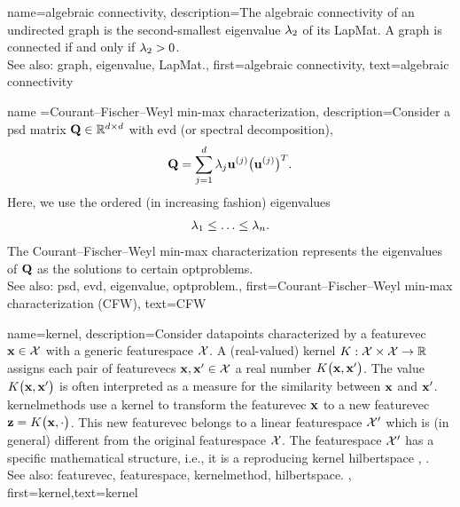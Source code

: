 {name={algebraic connectivity},
	description={The algebraic connectivity of an undirected \gls{graph} 
		is the second-smallest \gls{eigenvalue} $\lambda_{2}$ of its \gls{LapMat}. A \gls{graph} is connected if and only if 
		$\lambda_{2} >0$. 
				\\
		See also: \gls{graph}, \gls{eigenvalue}, \gls{LapMat}.},
	first={algebraic connectivity},
	text={algebraic connectivity}
}


{name ={Courant–Fischer–Weyl min-max characterization}, 
	description={Consider a \gls{psd} 
	matrix $\mathbf{Q} \in \mathbb{R}^{d \times d}$ with 
	\gls{evd} (or spectral decomposition), 
	$$ \mathbf{Q} = \sum_{j=1}^{d} \lambda_{j} {\bf u}^{(j)} \big(  {\bf u}^{(j)}  \big)^{T}.$$ 
	Here, we use the ordered (in increasing fashion) \glspl{eigenvalue} 
	\begin{equation}
		\nonumber
		 \lambda_{1}  \leq  \ldots \leq \lambda_{n}. 
	\end{equation}
	The Courant–Fischer–Weyl min-max characterization \cite[Th. 8.1.2]{GolubVanLoanBook} 
	represents the \glspl{eigenvalue} of $\mathbf{Q}$ as the solutions to certain \glspl{optproblem}.
			\\
		See also: \gls{psd}, \gls{evd}, \gls{eigenvalue}, \gls{optproblem}.}, 
	first={Courant–Fischer–Weyl min-max characterization (CFW)}, 
	text={CFW}
}

{name={kernel}, 
	description={Consider \glspl{datapoint} characterized by a \gls{featurevec} ${\bf x} \in \mathcal{X}$ 
		with a generic \gls{featurespace} $\mathcal{X}$. A (real-valued) kernel $K: \mathcal{X} \times \mathcal{X} \rightarrow \mathbb{R}$ 
		assigns each pair of \glspl{featurevec} ${\bf x}, {\bf x}' \in \mathcal{X}$ a real number $K\big({\bf x},{\bf x}'\big)$. 
		The value $K\big({\bf x},{\bf x}'\big)$ is often interpreted as a measure for the similarity between ${\bf x}$ 
		and ${\bf x}'$. \Glspl{kernelmethod} use a kernel to transform the \gls{featurevec} ${\bf x}$ to a new \gls{featurevec} ${\bf z} = K\big({\bf x},\cdot\big)$. 
         	This new \gls{featurevec} belongs to a linear \gls{featurespace} $\mathcal{X}'$ which is (in general)  
          	different from the original \gls{featurespace} $\mathcal{X}$. The \gls{featurespace} $\mathcal{X}'$ has 
          	a specific mathematical structure, i.e., it is a reproducing kernel \gls{hilbertspace} \cite{LearningKernelsBook}, \cite{LampertNowKernel}.
          		\\
		See also: \gls{featurevec}, \gls{featurespace}, \gls{kernelmethod}, \gls{hilbertspace}.
          },
	first={kernel},text={kernel} }
	
